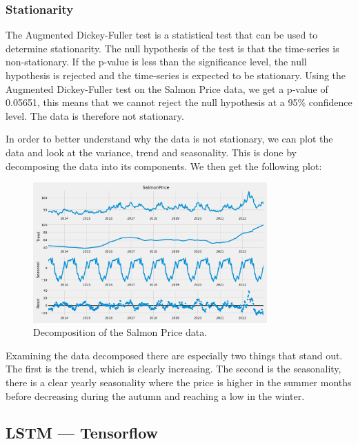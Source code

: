 \subsubsection{Stationarity}
The Augmented Dickey-Fuller test is a statistical test that can be used to determine stationarity. The null hypothesis of the test is that the time-series is non-stationary. If the p-value is less than the significance level, the null hypothesis is rejected and the time-series is expected to be stationary.
Using the Augmented Dickey-Fuller test on the Salmon Price data, we get a p-value of 0.05651, this means that we cannot reject the null hypothesis at a 95\% confidence level. The data is therefore not stationary.~\parencite{Dickey_Fuller1979}

In order to better understand why the data is not stationary, we can plot the data and look at the variance, trend and seasonality. This is done by decomposing the data into its components. We then get the following plot: 

\begin{figure}[H]
    \centering
    \includegraphics[width=0.8\textwidth]{data/Figures/ARIMA/Decomposition.png}
    \caption[Decomposition of the Salmon Price data]{Decomposition of the Salmon Price data.}\label{fig:Decomposition}
\end{figure}
Examining the data decomposed there are especially two things that stand out. The first is the trend, which is clearly increasing. The second is the seasonality, there is a clear yearly seasonality where the price is higher in the summer months before decreasing during the autumn and reaching a low in the winter.

\subsection{LSTM --- Tensorflow}